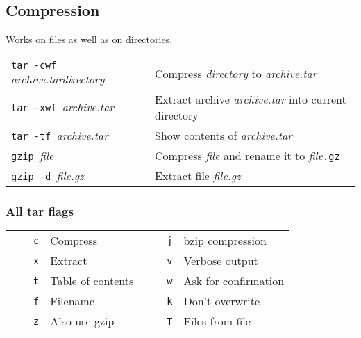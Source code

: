\subsection{Compression}
Works on files as well as on directories.\\
\begin{tabular}{@{}p{\the\MyLen}%
				@{}p{\linewidth-\the\MyLen}}
	\verb!tar -cwf !\textit{archive.tar}\textit{directory}	 		& Compress \textit{directory} to \textit{archive.tar}\\
	\verb!tar -xwf !\textit{archive.tar}							& Extract archive \textit{archive.tar} into current directory\\
	\verb!tar -tf !\textit{archive.tar}								& Show contents of \textit{archive.tar}\\
	\verb!gzip !\textit{file}										& Compress \textit{file} and rename it to \textit{file}\verb!.gz!\\
	\verb!gzip -d !\textit{file.gz}									& Extract file \textit{file.gz}\\
\end{tabular}

\subsubsection{All tar flags}
\begin{tabular}{llllll}
	~~ & \verb!c! & Compress 			& ~~ & \verb!j! & bzip compression \\ 
	~~ & \verb!x! & Extract 			& ~~ & \verb!v! & Verbose output \\ 
	~~ & \verb!t! & Table of contents 	& ~~ & \verb!w! & Ask for confirmation \\ 
	~~ & \verb!f! & Filename 			& ~~ & \verb!k! & Don't overwrite \\ 
	~~ & \verb!z! & Also use gzip 		& ~~ & \verb!T! & Files from file \\ 
\end{tabular}
